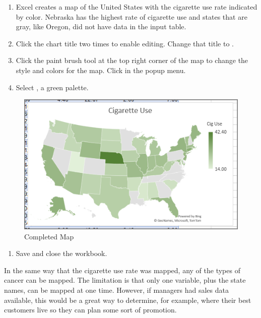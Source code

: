 \begin{enumerate}[resume]	
	\item Excel creates a map of the United States with the cigarette use rate indicated by color. Nebraska has the highest rate of cigarette use and states that are gray, like Oregon, did not have data in the input table.
	\item Click the chart title two times to enable editing. Change that title to .
	\item Click the paint brush tool at the top right corner of the map to change the style and colors for the map. Click  in the popup menu.
	\item Select , a green palette.
\end{enumerate}

\begin{figure}[H]
	\centering
	\includegraphics[width=\maxwidth{.95\linewidth}]{gfx/ch08_fig91}
	\caption{Completed Map}
	\label{08:fig91}
\end{figure}

\begin{enumerate}[resume]
	\item Save and close the  workbook.
\end{enumerate}

In the same way that the cigarette use rate was mapped, any of the types of cancer can be mapped. The limitation is that only one variable, plus the state names, can be mapped at one time. However, if managers had sales data available, this would be a great way to determine, for example, where their best customers live so they can plan some sort of promotion.



